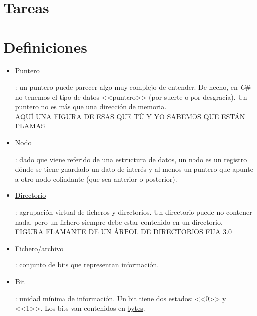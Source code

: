 \documentclass[11pt, oneside]{book}		%
\begin{document}
\chapter{Tareas}
\chapter*{Definiciones} %
\label{ch:definiciones}
\begin{itemize}

	\item \hypertarget{punteroDef}{\hyperlink{punteroRet}{Puntero}}: un puntero puede parecer algo muy complejo de entender. De hecho, en \textit{C}\# no tenemos el tipo de datos <<puntero>> (por suerte o por desgracia). Un puntero no es más que una dirección de memoria. 
	\\AQUÍ UNA FIGURA DE ESAS QUE TÚ Y YO SABEMOS QUE ESTÁN FLAMAS
	
	\item \hypertarget{nodoDef}{\hyperlink{nodoRet}{Nodo}}: dado que viene referido de una estructura de datos, un nodo es un registro dónde se tiene guardado un dato de interés y al menos un puntero que apunte a otro nodo colindante (que sea anterior o posterior). 
	
	\item \hypertarget{directorioDef}{\hyperlink{directorioRet}{Directorio}}: agrupación virtual de ficheros y directorios. Un directorio puede no contener nada, pero un fichero siempre debe estar contenido en un directorio.
	\\FIGURA FLAMANTE DE UN ÁRBOL DE DIRECTORIOS FUA 3.0
	
	\item \hypertarget{ficheroDef}{\hyperlink{ficheroRet}{Fichero/archivo}}: conjunto de \hypertarget{bitRet}{\hyperlink{bitDef}{bits}} que representan información.
	
	\item \hypertarget{bitDef}{\hyperlink{bitRet}{Bit}}: unidad mínima de información. Un bit tiene dos estados: <<0>> y <<1>>. Los bits van contenidos en \hypertarget{byteRet}{\hyperlink{byteDef}{bytes}}.
	

\end{itemize}
\end{document}
